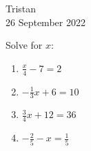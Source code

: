 \documentclass[14pt]{extarticle} %
\begin{document}
\hfill Tristan\\
\null\hfill 26 September 2022

\vspace{10mm}

Solve for $x$:
\begin{enumerate}[label=\Alph*.), itemsep=\fill]
\item $\frac{x}{4}-7=2$  %
\item $-\frac{1}{3}x+6=10$  %
\item $\frac{3}{4}x+12=36$  %
\item $-\frac{2}{5}-x=\frac{1}{5}$
\vfill\end{enumerate}
\end{document}
